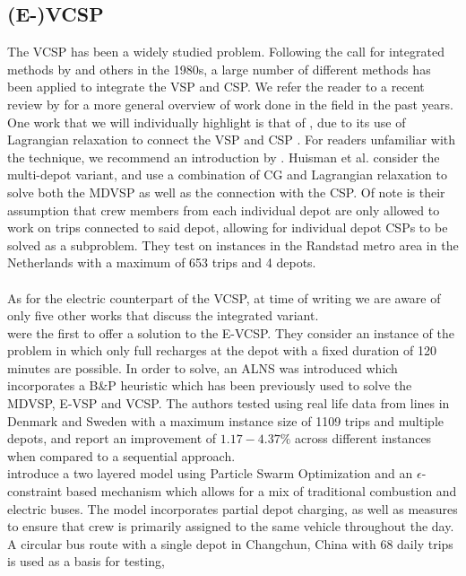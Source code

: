 \documentclass[]{article}
\begin{document}
\subsection{(E-)VCSP}
The VCSP has been a widely studied problem. Following the call for integrated methods by \citet{Bodin1983} and others in the 1980s, a large number of different methods has been applied to integrate the VSP and CSP. We refer the reader to a recent review by \citet{Ge2024} for a more general overview of work done in the field in the past years. \\
One work that we will individually highlight is that of \citet{Huisman2005}, due to its use of Lagrangian relaxation to connect the VSP and CSP . For readers unfamiliar with the technique, we recommend an introduction by \citet{Beasley1993}. Huisman et al. consider the multi-depot variant, and use a combination of CG and Lagrangian relaxation to solve both the MDVSP as well as the connection with the CSP. Of note is their assumption that crew members from each individual depot are only allowed to work on trips connected to said depot, allowing for individual depot CSPs to be solved as a subproblem. They test on instances in the Randstad metro area in the Netherlands with a maximum of 653 trips and 4 depots. \\\\
As for the electric counterpart of the VCSP, at time of writing we are aware of only five other works that discuss the integrated variant. \\
\citet{Perumal2021} were the first to offer a solution to the E-VCSP. They consider an instance of the problem in which only full recharges at the depot with a fixed duration of
120 minutes are possible. In order to solve, an ALNS was introduced which incorporates a B\&P heuristic
which has been previously used to solve the MDVSP, E-VSP and VCSP. The authors tested using real life data from lines in Denmark and Sweden with a
maximum instance size of 1109 trips and multiple depots, and report an improvement of $1.17-4.37\%$
across different instances when compared to a sequential approach. \\
\citet{Wang2022} introduce a two layered model using Particle Swarm Optimization and an
$\epsilon$-constraint based mechanism which allows for a mix of traditional
combustion and electric buses. The model incorporates partial
depot charging, as well as measures to ensure that crew is primarily assigned
to the same vehicle throughout the day. A circular bus route with a single
depot in Changchun, China with 68 daily trips is used as a basis for testing,
\end{document}
